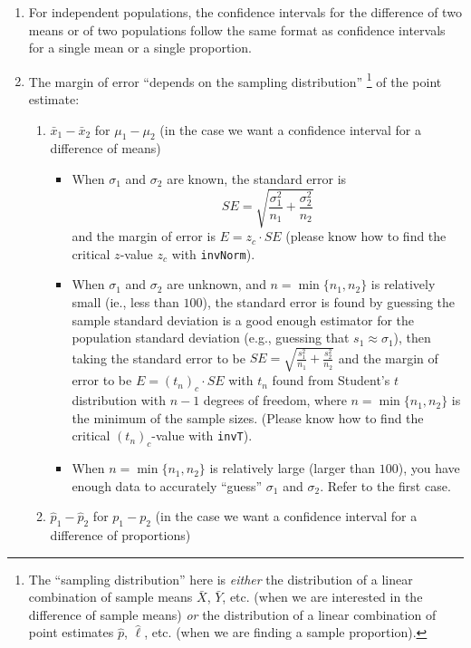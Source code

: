 \documentclass[11pt]{article}
\begin{document}
\begin{enumerate}[resume]

\item For independent populations, the confidence intervals for the difference of two means or of two populations follow the same format as confidence intervals for a single mean or a single proportion.

\newpage
\item The margin of error ``depends on the sampling distribution''%
    \footnote{%
    The ``sampling distribution'' here is \emph{either} the distribution of a linear combination of sample means $\bar{X}$, $\bar{Y}$, etc. (when we are interested in the difference of sample means) \emph{or} the distribution of a linear combination of point estimates $\hat{p}$, $\hat{\ell}$, etc. (when we are finding a sample proportion).
    }
of the point estimate:
\begin{enumerate}
    \item $\bar{x}_1 - \bar{x}_2$ for $\mu_1 - \mu_2$  (in the case we want a confidence interval for a difference of means)
    \begin{itemize}
        \item When $\sigma_1$ and $\sigma_2$ are known, the standard error is \[SE = \sqrt{\frac{\sigma_1^2}{n_1} +\frac{\sigma_2^2}{n_2}}\] and the margin of error is $E = z_c \cdot SE$ (please know how to find the critical $z$-value $z_c$ with \texttt{invNorm}).
        \item When $\sigma_1$ and $\sigma_2$ are unknown, and $n = \min\{n_1, n_2\}$ is relatively small (ie., less than $100$), the standard error is found by guessing the sample standard deviation is a good enough estimator for the population standard deviation (e.g., guessing that $s_1 \approx \sigma_1$), then taking the standard error to be $SE = \sqrt{\frac{s_1^2}{n_1} +\frac{s_2^2}{n_2}}$ and the margin of error to be $E = (t_n)_c \cdot SE$ with $t_n$ found from Student's $t$ distribution with $n - 1$ degrees of freedom, where $n =\min\{n_1, n_2\}$ is the minimum of the sample sizes. (Please know how to find the critical $(t_n)_c$-value with \texttt{invT}).
    \item When $n = \min\{n_1, n_2\}$ is relatively large (larger than $100$), you have enough data to accurately ``guess'' $\sigma_1$ and $\sigma_2$. Refer to the first case.
    \end{itemize}
    \item $\hat{p}_1 - \hat{p}_2$ for $p_1 - p_2$ (in the case we want a confidence interval for a difference of proportions)

\end{enumerate}
\end{enumerate}
\end{document}
